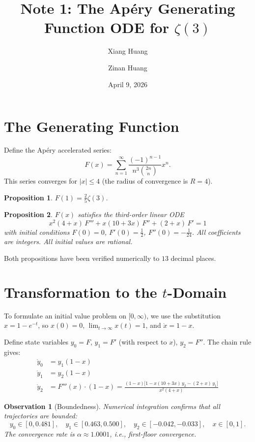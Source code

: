 \documentclass[11pt]{article}
\title{Note 1: The Ap\'ery Generating Function ODE for $\zeta(3)$}
\author{Xiang Huang \and Zinan Huang}
\date{April 9, 2026}
\newtheorem{proposition}{Proposition}
\newtheorem{observation}{Observation}
\theoremstyle{definition}
\begin{document}
\maketitle

\section{The Generating Function}

Define the Ap\'ery accelerated series:
\begin{equation}\label{eq:F}
  F(x) = \sum_{n=1}^{\infty} \frac{(-1)^{n-1}}{n^3 \binom{2n}{n}} x^n.
\end{equation}
This series converges for $|x| \le 4$ (the radius of convergence is $R=4$).

\begin{proposition}
$F(1) = \frac{2}{5}\zeta(3)$.
\end{proposition}

\begin{proposition}
$F(x)$ satisfies the third-order linear ODE
\begin{equation}\label{eq:ode}
  x^2(4+x)\,F''' + x(10+3x)\,F'' + (2+x)\,F' = 1
\end{equation}
with initial conditions $F(0) = 0$, $F'(0) = \frac{1}{2}$, $F''(0) = -\frac{1}{24}$.
All coefficients are integers. All initial values are rational.
\end{proposition}

Both propositions have been verified numerically to $13$ decimal places.

\section{Transformation to the $t$-Domain}

To formulate an initial value problem on $[0,\infty)$, we use the substitution $x = 1 - e^{-t}$, so $x(0) = 0$, $\lim_{t\to\infty} x(t) = 1$, and $\dot{x} = 1-x$.

Define state variables $y_0 = F$, $y_1 = F'$ (with respect to $x$), $y_2 = F''$. The chain rule gives:
\begin{align}
  \dot{y}_0 &= y_1 (1-x) \\
  \dot{y}_1 &= y_2 (1-x) \\
  \dot{y}_2 &= F'''(x) \cdot (1-x) = \frac{(1-x)\bigl[1 - x(10+3x)\,y_2 - (2+x)\,y_1\bigr]}{x^2(4+x)}
\end{align}

\begin{observation}[Boundedness]
Numerical integration confirms that all trajectories are bounded:
\[
  y_0 \in [0, 0.481], \quad y_1 \in [0.463, 0.500], \quad y_2 \in [-0.042, -0.033], \quad x \in [0, 1].
\]
The convergence rate is $\alpha \approx 1.0001$, i.e., first-floor convergence.
\end{observation}
\end{document}
